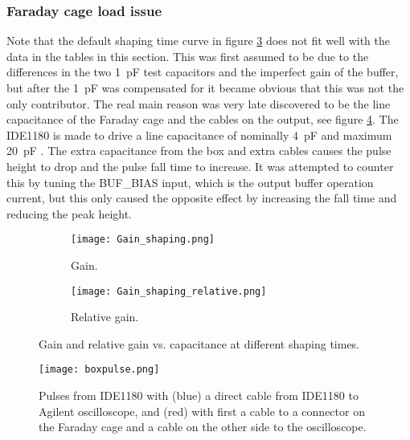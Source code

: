 \documentclass[../main/thesis.tex]{subfiles}
\begin{document}
\subsubsection{Faraday cage load issue}
Note that the default shaping time curve in figure \ref{fig-IDE1180-gain} does not fit well with the data in the tables in this section. This was first assumed to be due to the differences in the two 1~pF test capacitors and the imperfect gain of the buffer, but after the 1~pF was compensated for it became obvious that this was not the only contributor. The real main reason was very late discovered to be the line capacitance of the Faraday cage and the cables on the output, see figure \ref{fig-box-pulse}. The IDE1180 is made to drive a line capacitance of nominally 4~pF and maximum 20~pF \citep{IDE1180}. The extra capacitance from the box and extra cables causes the pulse height to drop and the pulse fall time to increase. It was attempted to counter this by tuning the BUF\_BIAS input, which is the output buffer operation current, but this only caused the opposite effect by increasing the fall time and reducing the peak height. 


\begin{figure}%
	\centering
	\begin{subfigure}{.5\textwidth}
		\centering
		\texttt{[image: Gain\_shaping.png]}
		\caption{Gain.}
		\label{fig-IDE1180-gain-}
	\end{subfigure}%
	\begin{subfigure}{.5\textwidth}
		\centering
		\texttt{[image: Gain\_shaping\_relative.png]}
		\caption{Relative gain.}
		\label{fig-IDE1180-gain-rel} %
	\end{subfigure}
	\caption{Gain and relative gain vs. capacitance at different shaping times.}
	\label{fig-IDE1180-gain}
\end{figure}

\begin{figure}%
	\centering
	\texttt{[image: boxpulse.png]}
	\caption{Pulses from IDE1180 with (blue) a direct cable from IDE1180 to Agilent oscilloscope, and (red) with first a cable to a connector on the Faraday cage and a cable on the other side to the oscilloscope.}
	\label{fig-box-pulse}
\end{figure} 
\end{document}
